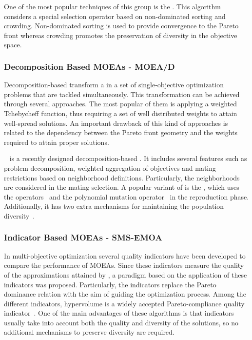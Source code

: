 One of the most popular techniques of this group is the \NSGAII{}.
%
This algorithm \cite{Joel:NSGAII} considers a special selection operator
based on non-dominated sorting and crowding.
%
Non-dominated sorting is used to provide convergence to the Pareto front whereas crowding promotes the preservation of diversity in the objective space.
%
%

\subsubsection{Decomposition Based MOEAs - MOEA/D}

Decomposition-based \MOEAS{} \cite{Joel:MOEAD} transform a \MOP{} in a set of single-objective optimization problems that are tackled simultaneously.
%
This transformation can be achieved through several approaches.
%
The most popular of them is applying a weighted Tchebycheff function, thus requiring a set of well distributed weights to attain well-spread solutions.
%
An important drawback of this kind of approaches is related to the dependency between the Pareto front geometry and the weights required to attain proper solutions.

\MOEAD{}~\cite{Joel:MOEAD} is a recently designed decomposition-based \MOEA{}.
%
It includes several features such as problem decomposition, weighted aggregation of objectives 
and mating restrictions based on neighborhood definitions.
%
Particularly, the neighborhoods are considered in the mating selection.
%
A popular variant of \MOEAD{} is the \MOEADDE{}, which uses the \DE{} operators~\cite{price2006differential} 
and the polynomial mutation operator~\cite{hamdan2012distribution} in the reproduction phase.
%
Additionally, it has two extra mechanisms for maintaining the population diversity~\cite{zhang2009performance}.
%

\subsubsection{Indicator Based MOEAs - SMS-EMOA}

In multi-objective optimization several quality indicators have been developed to compare the performance of MOEAs.
%
Since these indicators measure the quality of the approximations attained by \MOEAS{}, a paradigm based on the application of these indicators was proposed.
%
Particularly, the indicators replace the Pareto dominance relation with the aim of guiding the optimization process.
%
Among the different indicators, hypervolume is a widely accepted Pareto-compliance quality indicator~\cite{Joel:IGDPlus_And_GDPlus}.
%
One of the main advantages of these algorithms is that indicators usually take into account both the quality and diversity of the solutions,
so no additional mechanisms to preserve diversity are required.
%

